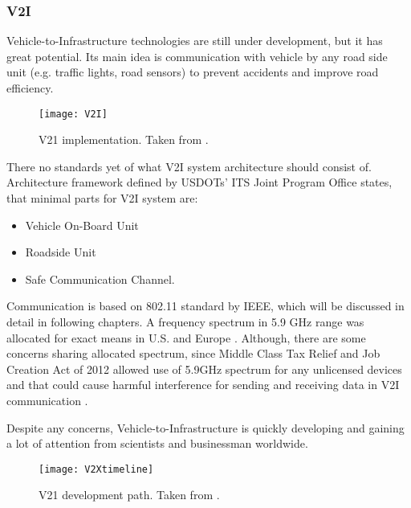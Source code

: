 \subsubsection{V2I}
% 
Vehicle-to-Infrastructure technologies are still under development, but it has great potential. Its main idea is communication with vehicle by any road side unit (e.g. traffic lights, road sensors) to prevent accidents and improve road efficiency.\par
% 
\begin{figure}[h]
\texttt{[image: V2I]}
\caption{V21 implementation. Taken from \cite{U.S.GovernmentAccountabilityOffice2015IntelligentExist}.}
\label{fig:V2Iimplementation}
\centering
\end{figure}
% 
There no standards yet of what V2I system architecture should consist of. Architecture framework defined by USDOTs' ITS Joint Program Office \cite{Dr.Gaspar2014HighlySystems} states, that minimal parts for V2I system are:
\begin{itemize}
    \item Vehicle On-Board Unit
    \item Roadside Unit
    \item Safe Communication Channel.
\end{itemize}
% 
Communication is based on 802.11 standard by IEEE, which will be discussed in detail in following chapters. A frequency spectrum in 5.9 GHz range was allocated for exact means in U.S. and Europe \cite{2011TheTechnology}. Although, there are some concerns sharing allocated spectrum, since Middle Class Tax Relief and Job Creation Act of 2012 allowed use of 5.9GHz spectrum for any unlicensed devices and that could cause harmful interference for sending and receiving data in V2I communication \cite{U.S.GovernmentAccountabilityOffice2015IntelligentExist}.\par
% 
Despite any concerns, Vehicle-to-Infrastructure is quickly developing and gaining a lot of attention from scientists and businessman worldwide.\par
% 
\begin{figure}[h]
\texttt{[image: V2Xtimeline]}
\caption{V21 development path. Taken from \cite{U.S.GovernmentAccountabilityOffice2015IntelligentExist}.}
\label{fig:V2Idevelopment}
\centering
\end{figure}
